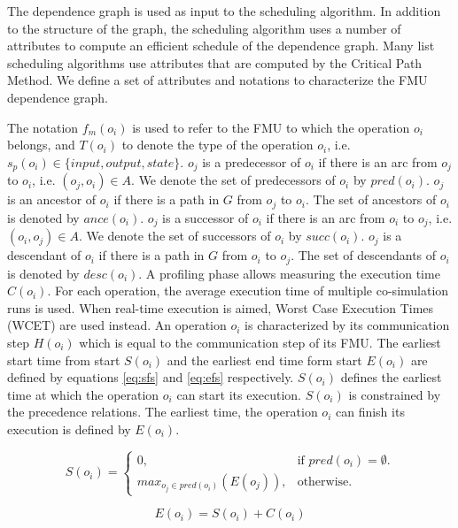 The dependence graph is used as input to the scheduling algorithm. In addition to the structure of the graph, the scheduling algorithm uses a number of attributes to compute an efficient schedule of the dependence graph. Many list scheduling algorithms use attributes that are computed by the Critical Path Method. We define a set of attributes and notations to characterize the FMU dependence graph.

The notation $f_m(o_i)$ is used to refer to the FMU to which the operation $o_i$ belongs, and $T(o_i)$ to denote the type of the operation $o_i$, i.e. $s_p(o_i) \in \{input,output,state\}$. $o_j$ is a predecessor of $o_i$ if there is an arc from $o_j$ to $o_i$, i.e. $(o_j, o_i) \in A$. We denote the set of predecessors of $o_i$ by $pred(o_i)$. $o_j$ is an ancestor of $o_i$ if there is a path in $G$ from $o_j$ to $o_i$. The set of ancestors of $o_i$ is denoted by $ance(o_i)$. $o_j$ is a successor of $o_i$ if there is an arc from $o_i$ to $o_j$, i.e. $(o_i, o_j) \in A$. We denote the set of successors of $o_i$ by $succ(o_i)$. $o_j$ is a descendant of $o_i$ if there is a path in $G$ from $o_i$ to $o_j$. The set of descendants of $o_i$ is denoted by $desc(o_i)$. A profiling phase allows measuring the execution time $C(o_i)$. For each operation, the average execution time of multiple co-simulation runs is used. When real-time execution is aimed, Worst Case Execution Times (WCET) are used instead. An operation $o_i$ is characterized by its communication step $H(o_i)$ which is equal to the communication step of its FMU. The earliest start time from start $S(o_i)$ and the earliest end time form start $E(o_i)$ are defined by equations \ref{eq:sfs} and \ref{eq:efs} respectively. $S(o_i)$ defines the earliest time at which the operation $o_i$ can start its execution. $S(o_i)$ is constrained by the precedence relations. The earliest time, the operation $o_i$ can finish its execution is defined by $E(o_i)$.

\begin{equation}
S(o_i)=\begin{cases}
    0, & \text{if $pred(o_i)=\emptyset$}.\\
    max_{o_j \in pred(o_i)}(E(o_j)), & \text{otherwise}.
  \end{cases}
	\label{eq:sfs}
\end{equation}

\begin{equation}
	E(o_i)=S(o_i)+C(o_i) 
	\label{eq:efs}
\end{equation}

